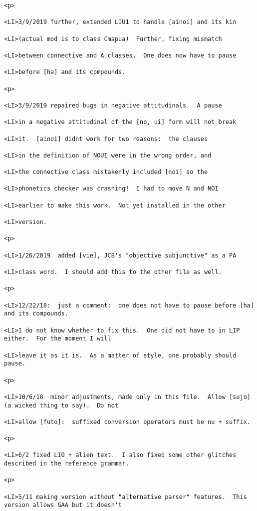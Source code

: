 \documentclass[12pt]{article}
\begin{document}
\begin{lstlisting}
<p>

<LI>3/9/2019 further, extended LIU1 to handle [ainoi] and its kin

<LI>(actual mod is to class Cmapua)  Further, fixing mismatch

<LI>between connective and A classes.  One does now have to pause

<LI>before [ha] and its compounds.

<p>

<LI>3/9/2019 repaired bugs in negative attitudinals.  A pause

<LI>in a negative attitudinal of the [no, ui] form will not break

<LI>it.  [ainoi] didnt work for two reasons:  the clauses

<LI>in the definition of NOUI were in the wrong order, and

<LI>the connective class mistakenly included [noi] so the

<LI>phonetics checker was crashing!  I had to move N and NOI

<LI>earlier to make this work.  Not yet installed in the other

<LI>version.

<p>

<LI>1/26/2019  added [vie], JCB's "objective subjunctive" as a PA

<LI>class word.  I should add this to the other file as well.

<p>

<LI>12/22/18:  just a comment:  one does not have to pause before [ha] and its compounds.

<LI>I do not know whether to fix this.  One did not have to in LIP either.  For the moment I will

<LI>leave it as it is.  As a matter of style, one probably should pause.

<p>

<LI>10/6/18  minor adjustments, made only in this file.  Allow [sujo] (a wicked thing to say).  Do not

<LI>allow [futo]:  suffixed conversion operators must be nu + suffix.

<p>

<LI>6/2 fixed LIO + alien text.  I also fixed some other glitches described in the reference grammar.

<p>

<LI>5/11 making version without "alternative parser" features.  This version allows GAA but it doesn't


\end{lstlisting}
\end{document}
